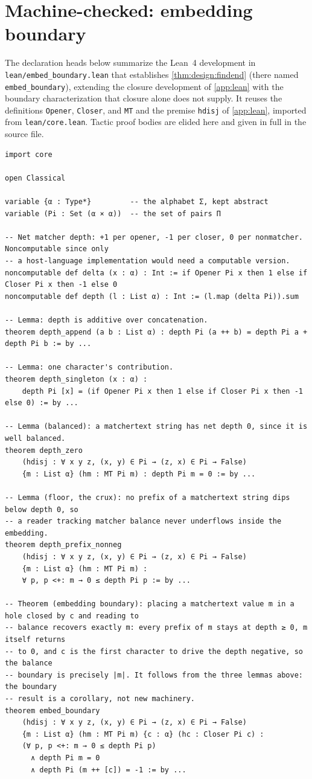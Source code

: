 \section{Machine-checked: embedding boundary}
\label{app:boundary}

The declaration heads below summarize the Lean~4 development in
\nolinkurl{lean/embed_boundary.lean} that establishes \cref{thm:design:findend}
(there named \texttt{embed\_boundary}),
extending the closure development of \cref{app:lean}
with the boundary characterization that closure alone does not supply.
It reuses the definitions \texttt{Opener}, \texttt{Closer}, and \texttt{MT}
and the premise \texttt{hdisj} of \cref{app:lean},
imported from \nolinkurl{lean/core.lean}.
Tactic proof bodies are elided here and given in full in the source file.

\begin{lstlisting}
import core

open Classical

variable {α : Type*}         -- the alphabet Σ, kept abstract
variable (Pi : Set (α × α))  -- the set of pairs Π

-- Net matcher depth: +1 per opener, -1 per closer, 0 per nonmatcher. Noncomputable since only
-- a host-language implementation would need a computable version.
noncomputable def delta (x : α) : Int := if Opener Pi x then 1 else if Closer Pi x then -1 else 0
noncomputable def depth (l : List α) : Int := (l.map (delta Pi)).sum

-- Lemma: depth is additive over concatenation.
theorem depth_append (a b : List α) : depth Pi (a ++ b) = depth Pi a + depth Pi b := by ...

-- Lemma: one character's contribution.
theorem depth_singleton (x : α) :
    depth Pi [x] = (if Opener Pi x then 1 else if Closer Pi x then -1 else 0) := by ...

-- Lemma (balanced): a matchertext string has net depth 0, since it is well balanced.
theorem depth_zero
    (hdisj : ∀ x y z, (x, y) ∈ Pi → (z, x) ∈ Pi → False)
    {m : List α} (hm : MT Pi m) : depth Pi m = 0 := by ...

-- Lemma (floor, the crux): no prefix of a matchertext string dips below depth 0, so
-- a reader tracking matcher balance never underflows inside the embedding.
theorem depth_prefix_nonneg
    (hdisj : ∀ x y z, (x, y) ∈ Pi → (z, x) ∈ Pi → False)
    {m : List α} (hm : MT Pi m) :
    ∀ p, p <+: m → 0 ≤ depth Pi p := by ...

-- Theorem (embedding boundary): placing a matchertext value m in a hole closed by c and reading to
-- balance recovers exactly m: every prefix of m stays at depth ≥ 0, m itself returns
-- to 0, and c is the first character to drive the depth negative, so the balance
-- boundary is precisely |m|. It follows from the three lemmas above: the boundary
-- result is a corollary, not new machinery.
theorem embed_boundary
    (hdisj : ∀ x y z, (x, y) ∈ Pi → (z, x) ∈ Pi → False)
    {m : List α} (hm : MT Pi m) {c : α} (hc : Closer Pi c) :
    (∀ p, p <+: m → 0 ≤ depth Pi p)
      ∧ depth Pi m = 0
      ∧ depth Pi (m ++ [c]) = -1 := by ...
\end{lstlisting}